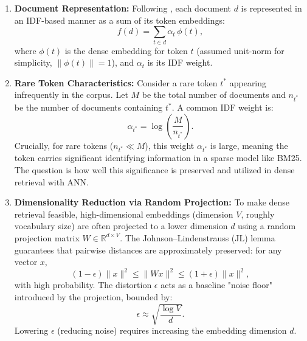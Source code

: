 \documentclass[manuscript]{acmart}
\begin{document}
\begin{enumerate}[label=(\arabic*)] %
\item \textbf{Document Representation:} Following \citet{tay2020sparse}, each document $d$ is represented in an IDF-based manner as a sum of its token embeddings:
\begin{equation}
f(d) = \sum_{t\in d} \alpha_t\, \phi(t), \label{eq:doc_rep}
\end{equation}
where $\phi(t)$ is the dense embedding for token $t$ (assumed unit-norm for simplicity, $\|\phi(t)\| = 1$), and $\alpha_t$ is its IDF weight.

\item \textbf{Rare Token Characteristics:} Consider a rare token $t^*$ appearing infrequently in the corpus. Let $M$ be the total number of documents and $n_{t^*}$ be the number of documents containing $t^*$. A common IDF weight is:
\begin{equation}
\alpha_{t^*} = \log\!\left(\frac{M}{n_{t^*}}\right). \label{eq:idf_weight}
\end{equation}
Crucially, for rare tokens ($n_{t^*} \ll M$), this weight $\alpha_{t^*}$ is large, meaning the token carries significant identifying information in a sparse model like BM25. The question is how well this significance is preserved and utilized in dense retrieval with ANN.

\item \textbf{Dimensionality Reduction via Random Projection:} To make dense retrieval feasible, high-dimensional embeddings (dimension $V$, roughly vocabulary size) are often projected to a lower dimension $d$ using a random projection matrix $W\in \mathbb{R}^{d\times V}$. The Johnson–Lindenstrauss (JL) lemma \cite{johnson1984extensions, dasgupta2003elementary} guarantees that pairwise distances are approximately preserved: for any vector $x$,
\begin{equation}
(1-\epsilon)\|x\|^2 \leq \|W x\|^2 \leq (1+\epsilon)\|x\|^2, \label{eq:jl_lemma}
\end{equation}
with high probability. The distortion $\epsilon$ acts as a baseline "noise floor" introduced by the projection, bounded by:
\begin{equation}
\epsilon \approx \sqrt{\frac{\log V}{d}}. \label{eq:jl_error_bound}
\end{equation}
Lowering $\epsilon$ (reducing noise) requires increasing the embedding dimension $d$.
\end{enumerate}
\end{document}
